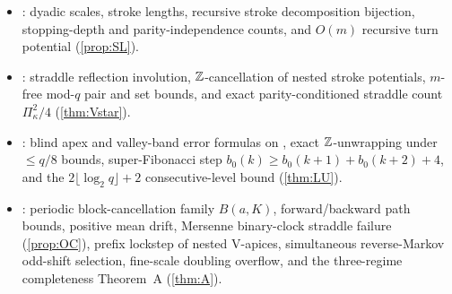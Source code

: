 \begin{itemize}[leftmargin=2em]
  (\cref{cor:Mstar}).
\item {}: dyadic scales, stroke lengths, recursive stroke decomposition bijection, stopping-depth
  and parity-independence counts, and $O(m)$ recursive turn potential  (\cref{prop:SL}).
\item {}: straddle reflection involution, $\mathbb{Z}$-cancellation of nested stroke potentials, $m$-free
  mod-$q$ pair and set bounds, and exact parity-conditioned straddle count $\Pi_\kappa^2 / 4$ (\cref{thm:Vstar}).
\item {}: blind apex and valley-band error formulas on , exact $\mathbb{Z}$-unwrapping
  under $\le q/8$ bounds, super-Fibonacci step $b_0(k) \ge b_0(k+1) + b_0(k+2) + 4$, and the $2\lfloor\log_2 q\rfloor + 2$
  consecutive-level bound (\cref{thm:LU}).
\item {}: periodic block-cancellation family $B(a, K)$, forward/backward path bounds, positive
  mean drift, Mersenne binary-clock straddle failure (\cref{prop:OC}), prefix lockstep of nested V-apices, simultaneous
  reverse-Markov odd-shift selection, fine-scale doubling overflow, and the three-regime completeness Theorem~A
  (\cref{thm:A}).
\end{itemize}
